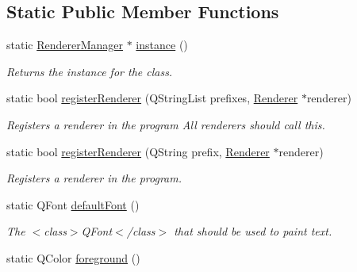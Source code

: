 \subsection*{\-Static \-Public \-Member \-Functions}
\begin{DoxyCompactItemize}
\item 
\hypertarget{classRendererManager_ac924887f22b24c7625a9bc8e6bf0ab43}{
static \hyperlink{classRendererManager}{\-Renderer\-Manager} $\ast$ \hyperlink{classRendererManager_ac924887f22b24c7625a9bc8e6bf0ab43}{instance} ()}
\label{classRendererManager_ac924887f22b24c7625a9bc8e6bf0ab43}

\begin{DoxyCompactList}\small\item\em \-Returns the instance for the class. \end{DoxyCompactList}\item 
static bool \hyperlink{classRendererManager_a6b2ff8605201c19af0619790632195cc}{register\-Renderer} (\-Q\-String\-List prefixes, \hyperlink{classRenderer}{\-Renderer} $\ast$renderer)
\begin{DoxyCompactList}\small\item\em \-Registers a renderer in the program \-All renderers should call this. \end{DoxyCompactList}\item 
static bool \hyperlink{classRendererManager_ae4d294c2d7a7e7e9e959aaf5dbe080a3}{register\-Renderer} (\-Q\-String prefix, \hyperlink{classRenderer}{\-Renderer} $\ast$renderer)
\begin{DoxyCompactList}\small\item\em \-Registers a renderer in the program. \end{DoxyCompactList}\item 
\hypertarget{classRendererManager_a1125de78f39079a019c4240615a402a5}{
static \-Q\-Font \hyperlink{classRendererManager_a1125de78f39079a019c4240615a402a5}{default\-Font} ()}
\label{classRendererManager_a1125de78f39079a019c4240615a402a5}

\begin{DoxyCompactList}\small\item\em \-The $<$class$>$\-Q\-Font$<$/class$>$ that should be used to paint text. \end{DoxyCompactList}\item 
\hypertarget{classRendererManager_a81a7c68439fc4a558c537bda422a31f9}{
static \-Q\-Color \hyperlink{classRendererManager_a81a7c68439fc4a558c537bda422a31f9}{foreground} ()}
\label{classRendererManager_a81a7c68439fc4a558c537bda422a31f9}


\end{DoxyCompactItemize}
